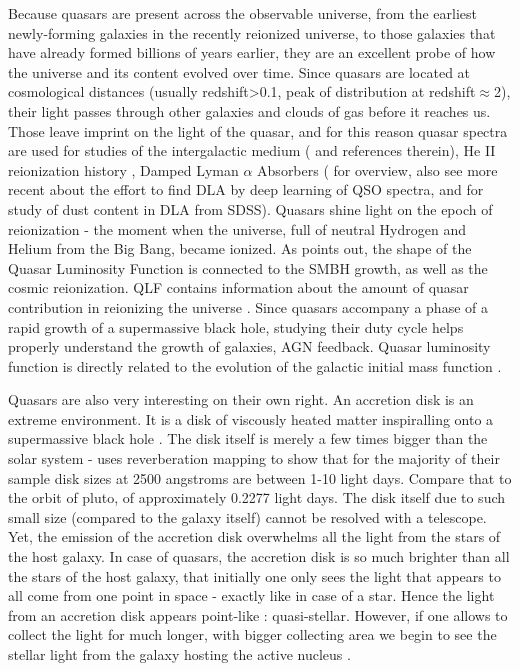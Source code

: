 \documentclass[modern]{aastex62}
\begin{document}
Because quasars are present across the observable universe, from the earliest newly-forming galaxies in the recently reionized universe, to those galaxies that have already formed billions of years earlier, they are an excellent probe of how the universe and its content evolved over time. 
Since quasars are located at cosmological distances (usually redshift>0.1, peak of distribution at redshift$\approx$2), their light passes through other galaxies and clouds of gas before it reaches us. Those leave imprint on the light of the quasar, and for this reason quasar spectra are used  for studies of the intergalactic medium (\cite{prochaska2014} and references therein),  He II reionization history \citep{khrykin2017} , Damped Lyman $\alpha$ Absorbers (\cite{wolfe2005} for overview, also see more recent \cite{parks2018} about the effort to find DLA by deep learning of QSO spectra, and \cite{murphy2016} for study of  dust content in DLA from SDSS).  Quasars shine light on the epoch of reionization - the moment when the universe, full of neutral Hydrogen and Helium from the Big Bang, became ionized. As  \cite{alsayyad2016} points out, the shape of the Quasar Luminosity Function is connected to the SMBH growth, as well as the cosmic reionization. QLF contains information about the amount of quasar contribution in reionizing the universe \citep{glikman2011, masters2012, ross2013}. Since quasars accompany a phase of a rapid growth of a supermassive black hole, studying their duty cycle helps properly understand the growth of galaxies, AGN feedback. Quasar luminosity function is directly related to the evolution of the galactic initial mass function \citep{mcgreer2013}. 

Quasars are also very interesting on their own right. An accretion disk is an extreme environment. It is a disk of viscously heated matter inspiralling onto a supermassive black hole \citep{ruan2017}. The disk itself is merely a few times bigger than  the solar system -  \citep{mudd2017} uses reverberation mapping to show that for the majority of their sample disk sizes at 2500 angstroms are between 1-10 light days. Compare that to the orbit of pluto, of approximately 0.2277 light days. The disk itself due to such small size (compared to the galaxy itself) cannot be resolved with a telescope.  Yet, the emission of the accretion disk overwhelms all the light from the stars of the host galaxy.   In case of quasars, the accretion disk is so much brighter than all the stars of the host galaxy, that initially one only sees the light that appears to all come from one point in space - exactly like in case of a star. Hence the light from an accretion disk appears point-like : quasi-stellar. However,  if one allows to collect the light for much longer, with bigger collecting area  we begin to see the stellar light from the galaxy hosting the active nucleus \citep{hutchings2002,kotilainen2013, falomo2014, liuzzo2016, bayliss2017}. 
\end{document}
